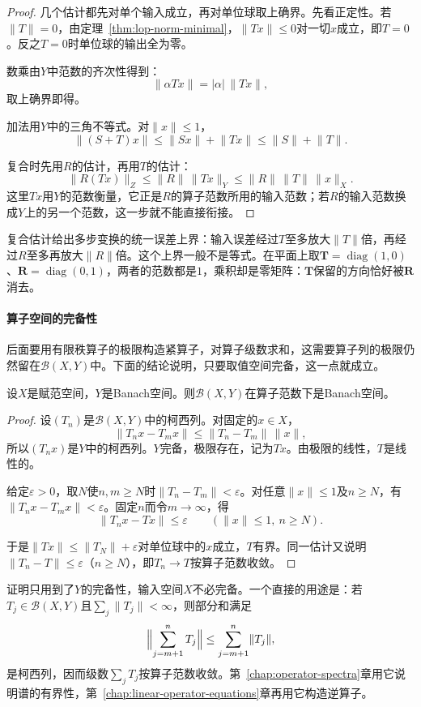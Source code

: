 \begin{proof}
几个估计都先对单个输入成立，再对单位球取上确界。先看正定性。若$\lVert T\rVert=0$，由定理~\ref{thm:lop-norm-minimal}，$\lVert Tx\rVert\leq0$对一切$x$成立，即$T=0$。反之$T=0$时单位球的输出全为零。

数乘由$Y$中范数的齐次性得到：
\[
 \lVert\alpha Tx\rVert=\lvert\alpha\rvert\,\lVert Tx\rVert,
\]
取上确界即得。

加法用$Y$中的三角不等式。对$\lVert x\rVert\leq1$，
\[
 \lVert(S+T)x\rVert\leq\lVert Sx\rVert+\lVert Tx\rVert\leq\lVert S\rVert+\lVert T\rVert.
\]

复合时先用$R$的估计，再用$T$的估计：
\[
 \lVert R(Tx)\rVert_Z\leq\lVert R\rVert\,\lVert Tx\rVert_Y\leq\lVert R\rVert\,\lVert T\rVert\,\lVert x\rVert_X.
\]
这里$Tx$用$Y$的范数衡量，它正是$R$的算子范数所用的输入范数；若$R$的输入范数换成$Y$上的另一个范数，这一步就不能直接衔接。
\end{proof}

复合估计给出多步变换的统一误差上界：输入误差经过$T$至多放大$\lVert T\rVert$倍，再经过$R$至多再放大$\lVert R\rVert$倍。这个上界一般不是等式。在平面上取$\bm T=\operatorname{diag}(1,0)$、$\bm R=\operatorname{diag}(0,1)$，两者的范数都是$1$，乘积却是零矩阵：$\bm T$保留的方向恰好被$\bm R$消去。

\paragraph{算子空间的完备性}
后面要用有限秩算子的极限构造紧算子，对算子级数求和，这需要算子列的极限仍然留在$\mathcal B(X,Y)$中。下面的结论说明，只要取值空间完备，这一点就成立。

\begin{theorem}[算子空间的完备性]
\label{thm:lop-operator-space-complete}
设$X$是赋范空间，$Y$是Banach空间。则$\mathcal B(X,Y)$在算子范数下是Banach空间。
\end{theorem}

\begin{proof}
设$(T_n)$是$\mathcal B(X,Y)$中的柯西列。对固定的$x\in X$，
\[
 \lVert T_nx-T_mx\rVert\leq\lVert T_n-T_m\rVert\,\lVert x\rVert,
\]
所以$(T_nx)$是$Y$中的柯西列。$Y$完备，极限存在，记为$Tx$。由极限的线性，$T$是线性的。

给定$\varepsilon>0$，取$N$使$n,m\geq N$时$\lVert T_n-T_m\rVert<\varepsilon$。对任意$\lVert x\rVert\leq1$及$n\geq N$，有$\lVert T_nx-T_mx\rVert<\varepsilon$。固定$n$而令$m\to\infty$，得
\[
 \lVert T_nx-Tx\rVert\leq\varepsilon\qquad(\lVert x\rVert\leq1,\ n\geq N).
\]

于是$\lVert Tx\rVert\leq\lVert T_N\rVert+\varepsilon$对单位球中的$x$成立，$T$有界。同一估计又说明$\lVert T_n-T\rVert\leq\varepsilon$（$n\geq N$），即$T_n\to T$按算子范数收敛。
\end{proof}

证明只用到了$Y$的完备性，输入空间$X$不必完备。一个直接的用途是：若$T_j\in\mathcal B(X,Y)$且$\sum_j\lVert T_j\rVert<\infty$，则部分和满足
\[
 \Bigl\lVert\sum_{j=m+1}^nT_j\Bigr\rVert\leq\sum_{j=m+1}^n\lVert T_j\rVert,
\]
是柯西列，因而级数$\sum_jT_j$按算子范数收敛。第~\ref{chap:operator-spectra}章用它说明谱的有界性，第~\ref{chap:linear-operator-equations}章再用它构造逆算子。
